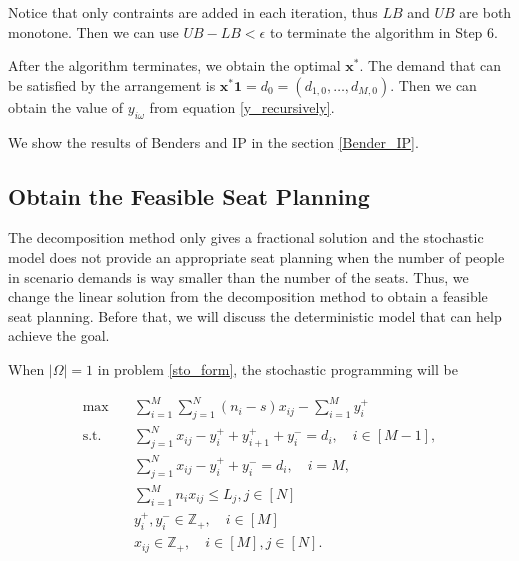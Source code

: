 \begin{remark}
  Notice that only contraints are added in each iteration, thus $LB$ and $UB$ are both monotone. Then we can use $UB - LB < \epsilon$ to terminate the algorithm in Step 6.
\end{remark}


After the algorithm terminates, we obtain the optimal $\mathbf{x}^{*}$. The demand that can be satisfied by the arrangement is $\mathbf{x}^{*} \mathbf{1} = d_0 = (d_{1,0},\ldots,d_{M,0})$.
Then we can obtain the value of $y_{i \omega}$ from equation \eqref{y_recursively}.

We show the results of Benders and IP in the section \ref{Bender_IP}.

\subsection{Obtain the Feasible Seat Planning}\label{seat_assignment}
The decomposition method only gives a fractional solution and the stochastic model does not provide an appropriate seat planning when the number of people in scenario demands is way smaller than the number of the seats. Thus, we change the linear solution from the decomposition method to obtain a feasible seat planning. Before that, we will discuss the deterministic model that can help achieve the goal. 


When $|\Omega| =1$ in problem \eqref{sto_form}, the stochastic programming will be 

\begin{equation}\label{one_form}
  \begin{aligned}
  \max \quad & \sum_{i=1}^{M}  \sum_{j= 1}^{N} (n_i-s) x_{ij} - \sum_{i=1}^{M} y_{i}^{+}  \\
  \text {s.t.} \quad & \sum_{j= 1}^{N} x_{ij} - y_{i}^{+}+ y_{i+1}^{+} + y_{i}^{-} = d_{i}, \quad i \in [M-1], \\
  & \sum_{j= 1}^{N} x_{ij} -y_{i}^{+} + y_{i}^{-} = d_{i}, \quad i = M, \\
  & \sum_{i=1}^{M} n_{i} x_{ij} \leq L_j, j \in [N]\\
  & y_{i}^{+}, y_{i}^{-} \in \mathbb{Z}_{+}, \quad i \in [M] \\
  & x_{ij} \in \mathbb{Z}_{+}, \quad i \in [M], j \in [N].
  \end{aligned}
\end{equation}

